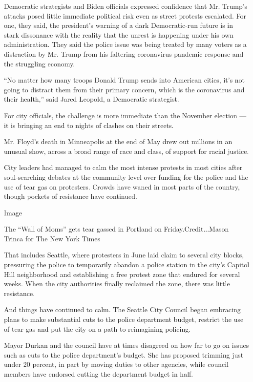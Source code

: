 Democratic strategists and Biden officials expressed confidence that Mr.
Trump's attacks posed little immediate political risk even as street
protests escalated. For one, they said, the president's warning of a
dark Democratic-run future is in stark dissonance with the reality that
the unrest is happening under his own administration. They said the
police issue was being treated by many voters as a distraction by Mr.
Trump from his faltering coronavirus pandemic response and the
struggling economy.

``No matter how many troops Donald Trump sends into American cities,
it's not going to distract them from their primary concern, which is the
coronavirus and their health,'' said Jared Leopold, a Democratic
strategist.

For city officials, the challenge is more immediate than the November
election --- it is bringing an end to nights of clashes on their
streets.

Mr. Floyd's death in Minneapolis at the end of May drew out millions in
an unusual show, across a broad range of race and class, of support for
racial justice.

City leaders had managed to calm the most intense protests in most
cities after soul-searching debates at the community level over funding
for the police and the use of tear gas on protesters. Crowds have waned
in most parts of the country, though pockets of resistance have
continued.

Image

The ``Wall of Moms'' gets tear gassed in Portland on
Friday.Credit...Mason Trinca for The New York Times

That includes Seattle, where protesters in June laid claim to several
city blocks, pressuring the police to temporarily abandon a police
station in the city's Capitol Hill neighborhood and establishing a free
protest zone that endured for several weeks. When the city authorities
finally reclaimed the zone, there was little resistance.

And things have continued to calm. The Seattle City Council began
embracing plans to make substantial cuts to the police department
budget, restrict the use of tear gas and put the city on a path to
reimagining policing.

Mayor Durkan and the council have at times disagreed on how far to go on
issues such as cuts to the police department's budget. She has proposed
trimming just under 20 percent, in part by moving duties to other
agencies, while council members have endorsed cutting the department
budget in half.

